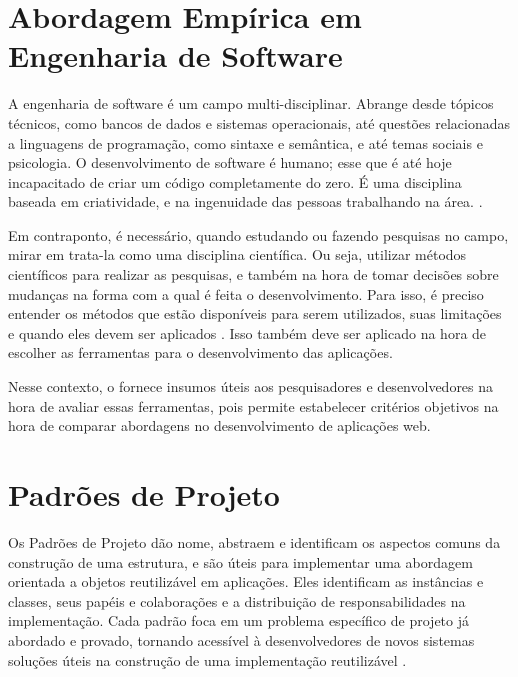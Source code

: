 \documentclass[12pt]{tcc}
\begin{document}
	\section{Abordagem Empírica em Engenharia de Software}
	\label{cap:engenharia-de-software-empirica}

	A engenharia de software é um campo multi-disciplinar. Abrange desde tópicos técnicos, como bancos de dados e sistemas operacionais, até questões relacionadas a linguagens de programação, como sintaxe e semântica, e até temas sociais e  psicologia. O desenvolvimento de software é humano; esse que é até hoje incapacitado de criar um código completamente do zero. É uma disciplina baseada em criatividade, e na ingenuidade das pessoas trabalhando na área. \citep{wohlin2012experimentation}.

	Em contraponto, é necessário, quando estudando ou fazendo pesquisas no campo, mirar em trata-la como uma disciplina científica. Ou seja, utilizar métodos científicos para realizar as pesquisas, e também na hora de tomar decisões sobre mudanças na forma com a qual é feita o desenvolvimento. Para isso, é preciso entender os métodos que estão disponíveis para serem utilizados, suas limitações e quando eles devem ser aplicados \citep{wohlin2012experimentation}. Isso também deve ser aplicado na hora de escolher as ferramentas para o desenvolvimento das aplicações.

	Nesse contexto, o  fornece insumos úteis aos pesquisadores e desenvolvedores na hora de avaliar essas ferramentas, pois permite estabelecer critérios objetivos na hora de comparar abordagens no desenvolvimento de aplicações web.

	\section{Padrões de Projeto}
	\label{cap:padroes-de-projeto}

	Os Padrões de Projeto dão nome, abstraem e identificam os aspectos comuns da construção de uma estrutura, e são úteis para implementar uma abordagem orientada a objetos reutilizável em aplicações. Eles identificam as instâncias e classes, seus papéis e colaborações e a distribuição de responsabilidades na implementação. Cada padrão foca em um problema específico de projeto já abordado e provado, tornando acessível à desenvolvedores de novos sistemas soluções úteis na construção de uma implementação reutilizável \citep{gamma1994design}.
	
\end{document}
